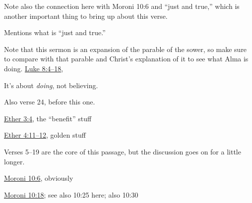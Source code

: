 \begin{compactdesc}
\begin{compactitem}
					\item Note also the connection here with Moroni 10:6 and ``just and true,'' which is another important thing to bring up about this verse.
				\end{compactitem}
			\item[{\hyperref[ALMA-18-34]{Alma 18:34}}] \phantom{.}
				\begin{compactitem}
					\item Mentions what is ``just and true.''
				\end{compactitem}
			\item[{\hyperref[ALMA-32-27]{Alma 32:27--43}}] \phantom{.}
				\begin{compactitem}
					\item Note that this sermon is an expansion of the parable of the sower, so make sure to compare with that parable and Christ's explanation of it to see what Alma is doing. \hyperref[LUKE-8-4]{Luke 8:4--18}, 
				\end{compactitem}
			\item[{\hyperref[HELAMAN-7-26]{Helaman 7:26}}]
			\item[{\hyperref[HELAMAN-12-26]{Helaman 12:26}}] \phantom{.}
				\begin{compactitem}
					\item It's about \textit{doing}, not believing.
					\item Also verse 24, before this one.
				\end{compactitem}
			\item \hyperref[ETHER-3-4]{Ether 3:4}, the ``benefit'' stuff
			\item \hyperref[ETHER-4-11]{Ether 4:11--12}, golden stuff
			\item[{\hyperref[ETHER-8-26]{Ether 8:26}}]
			\item[{\hyperref[MORONI-7-15]{Moroni 7:5--26}}] Verses 5--19 are the core of this passage, but the discussion goes on for a little longer. 
			\item \hyperref[MORONI-10-6]{Moroni 10:6}, obviously
			\item \hyperref[MORONI-10-18]{Moroni 10:18}; see also 10:25 here; also 10:30	
			

\end{compactdesc}
